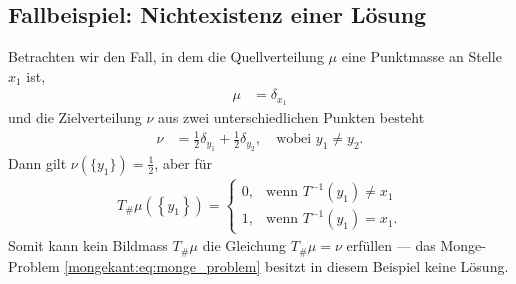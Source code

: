 \subsection{Fallbeispiel: Nichtexistenz einer Lösung%
\label{mongekant:subsection:monge_inexistence}}
Betrachten wir den Fall,
in dem die Quellverteilung $\mu$ eine Punktmasse an Stelle $x_1$ ist,
\begin{align*}
\mu
&=
\delta_{x_1}
\end{align*}
und die Zielverteilung $\nu$ aus zwei unterschiedlichen Punkten besteht
\begin{align*}
\nu
&=
\frac{1}{2} \delta_{y_1} + \frac{1}{2} \delta_{y_2}
,\quad
\text{wobei } y_1 \neq y_2
.
\end{align*}
Dann gilt $\nu(\{y_1\}) = \frac{1}{2}$,
aber für
\begin{align*}
T_{\#}\mu\left(\left\{y_1\right\}\right)
=
\begin{cases}
0,
&\text{wenn }
T^{-1}(y_1)
\neq
x_1
\\
1,
&\text{wenn }
T^{-1}(y_1)
=
x_1
.
\end{cases}
\end{align*}
Somit kann kein Bildmass $T_{\#}\mu$ die Gleichung $T_{\#}\mu=\nu$ erfüllen ---
das Monge-Problem \eqref{mongekant:eq:monge_problem}
besitzt in diesem Beispiel keine Lösung.


